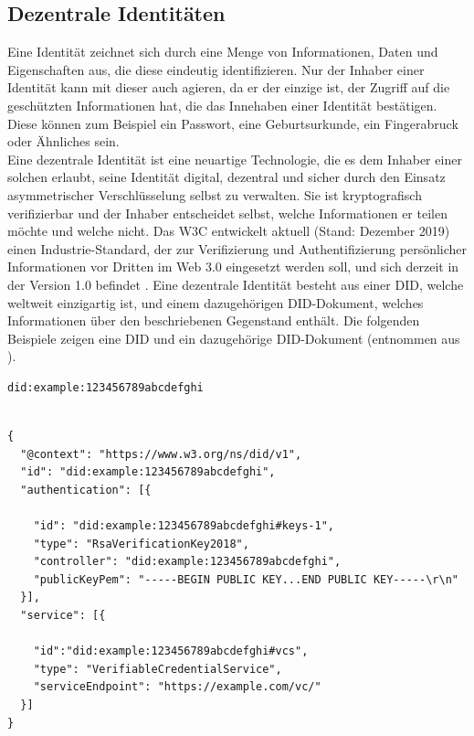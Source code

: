 \subsection{Dezentrale Identitäten}
\label{subsec:fundamentals:dlt:did}
Eine Identität zeichnet sich durch eine Menge von Informationen, Daten und Eigenschaften aus, die diese eindeutig identifizieren. Nur der Inhaber einer Identität kann mit dieser auch agieren, da er der einzige ist, der Zugriff auf die geschützten Informationen hat, die das Innehaben einer Identität bestätigen. Diese können zum Beispiel ein Passwort, eine Geburtsurkunde, ein Fingerabruck oder Ähnliches sein.\\
Eine dezentrale Identität ist eine neuartige Technologie, die es dem Inhaber einer solchen erlaubt, seine Identität digital, dezentral und sicher durch den Einsatz asymmetrischer Verschlüsselung selbst zu verwalten. Sie ist kryptografisch verifizierbar und der Inhaber entscheidet selbst, welche Informationen er teilen möchte und welche nicht. Das \ac{W3C} entwickelt aktuell (Stand: Dezember 2019) einen Industrie-Standard, der zur Verifizierung und Authentifizierung persönlicher Informationen vor Dritten im Web 3.0 eingesetzt werden soll, und sich derzeit in der Version 1.0 befindet \cite{did2019}. Eine dezentrale Identität besteht aus einer \ac{DID}, welche weltweit einzigartig ist, und einem dazugehörigen DID-Dokument, welches Informationen über den beschriebenen Gegenstand enthält. Die folgenden Beispiele zeigen eine \ac{DID} und ein dazugehörige DID-Dokument (entnommen aus \cite{did2019}).

\begin{lstlisting}[caption=Beispiel einer DID,label=listing:did]
did:example:123456789abcdefghi
\end{lstlisting}

\begin{lstlisting}[caption=Beispiel eines DID-Dokuments,label=listing:did_document]

{
  "@context": "https://www.w3.org/ns/did/v1",
  "id": "did:example:123456789abcdefghi",
  "authentication": [{

    "id": "did:example:123456789abcdefghi#keys-1",
    "type": "RsaVerificationKey2018",
    "controller": "did:example:123456789abcdefghi",
    "publicKeyPem": "-----BEGIN PUBLIC KEY...END PUBLIC KEY-----\r\n"
  }],
  "service": [{

    "id":"did:example:123456789abcdefghi#vcs",
    "type": "VerifiableCredentialService",
    "serviceEndpoint": "https://example.com/vc/"
  }]
}
\end{lstlisting}

